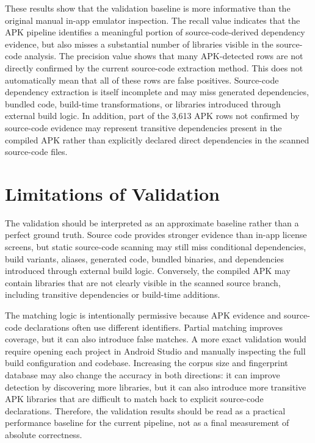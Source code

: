 \documentclass[12pt,a4paper]{report}
\begin{document}
These results show that the validation baseline is more informative than the original manual in-app emulator inspection. The recall value indicates that the APK pipeline identifies a meaningful portion of source-code-derived dependency evidence, but also misses a substantial number of libraries visible in the source-code analysis. The precision value shows that many APK-detected rows are not directly confirmed by the current source-code extraction method. This does not automatically mean that all of these rows are false positives. Source-code dependency extraction is itself incomplete and may miss generated dependencies, bundled code, build-time transformations, or libraries introduced through external build logic. In addition, part of the 3,613 APK rows not confirmed by source-code evidence may represent transitive dependencies present in the compiled APK rather than explicitly declared direct dependencies in the scanned source-code files.

\section{Limitations of Validation}
The validation should be interpreted as an approximate baseline rather than a perfect ground truth. Source code provides stronger evidence than in-app license screens, but static source-code scanning may still miss conditional dependencies, build variants, aliases, generated code, bundled binaries, and dependencies introduced through external build logic. Conversely, the compiled APK may contain libraries that are not clearly visible in the scanned source branch, including transitive dependencies or build-time additions.

The matching logic is intentionally permissive because APK evidence and source-code declarations often use different identifiers. Partial matching improves coverage, but it can also introduce false matches. A more exact validation would require opening each project in Android Studio and manually inspecting the full build configuration and codebase. Increasing the corpus size and fingerprint database may also change the accuracy in both directions: it can improve detection by discovering more libraries, but it can also introduce more transitive APK libraries that are difficult to match back to explicit source-code declarations. Therefore, the validation results should be read as a practical performance baseline for the current pipeline, not as a final measurement of absolute correctness.
\end{document}
